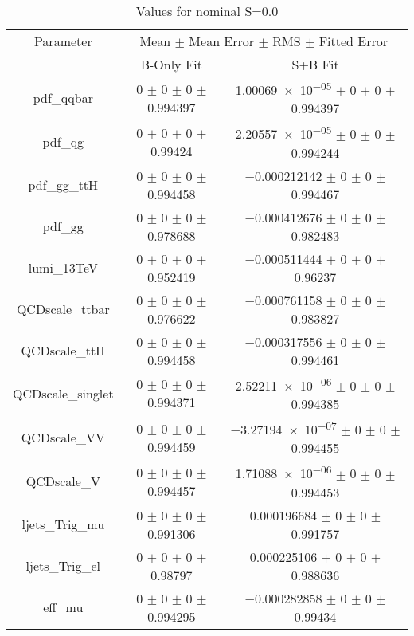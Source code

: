 \begin{table}
\centering
\caption{Values for nominal S=0.0}
\begin{tabular}{ccc}
\toprule
Parameter 	& \multicolumn{2}{c}{Mean $\pm$ Mean Error $\pm$ RMS $\pm$ Fitted Error}\\
 	& B-Only Fit & S+B Fit\\
\midrule
pdf\_qqbar 	& \num{0} $\pm$ \num{0} $\pm$ \num{0} $\pm$ \num{0.994397} 	& \num{1.00069e-05} $\pm$ \num{0} $\pm$ \num{0} $\pm$ \num{0.994397}\\
pdf\_qg 	& \num{0} $\pm$ \num{0} $\pm$ \num{0} $\pm$ \num{0.99424} 	& \num{2.20557e-05} $\pm$ \num{0} $\pm$ \num{0} $\pm$ \num{0.994244}\\
pdf\_gg\_ttH 	& \num{0} $\pm$ \num{0} $\pm$ \num{0} $\pm$ \num{0.994458} 	& \num{-0.000212142} $\pm$ \num{0} $\pm$ \num{0} $\pm$ \num{0.994467}\\
pdf\_gg 	& \num{0} $\pm$ \num{0} $\pm$ \num{0} $\pm$ \num{0.978688} 	& \num{-0.000412676} $\pm$ \num{0} $\pm$ \num{0} $\pm$ \num{0.982483}\\
lumi\_13TeV 	& \num{0} $\pm$ \num{0} $\pm$ \num{0} $\pm$ \num{0.952419} 	& \num{-0.000511444} $\pm$ \num{0} $\pm$ \num{0} $\pm$ \num{0.96237}\\
QCDscale\_ttbar 	& \num{0} $\pm$ \num{0} $\pm$ \num{0} $\pm$ \num{0.976622} 	& \num{-0.000761158} $\pm$ \num{0} $\pm$ \num{0} $\pm$ \num{0.983827}\\
QCDscale\_ttH 	& \num{0} $\pm$ \num{0} $\pm$ \num{0} $\pm$ \num{0.994458} 	& \num{-0.000317556} $\pm$ \num{0} $\pm$ \num{0} $\pm$ \num{0.994461}\\
QCDscale\_singlet 	& \num{0} $\pm$ \num{0} $\pm$ \num{0} $\pm$ \num{0.994371} 	& \num{2.52211e-06} $\pm$ \num{0} $\pm$ \num{0} $\pm$ \num{0.994385}\\
QCDscale\_VV 	& \num{0} $\pm$ \num{0} $\pm$ \num{0} $\pm$ \num{0.994459} 	& \num{-3.27194e-07} $\pm$ \num{0} $\pm$ \num{0} $\pm$ \num{0.994455}\\
QCDscale\_V 	& \num{0} $\pm$ \num{0} $\pm$ \num{0} $\pm$ \num{0.994457} 	& \num{1.71088e-06} $\pm$ \num{0} $\pm$ \num{0} $\pm$ \num{0.994453}\\
ljets\_Trig\_mu 	& \num{0} $\pm$ \num{0} $\pm$ \num{0} $\pm$ \num{0.991306} 	& \num{0.000196684} $\pm$ \num{0} $\pm$ \num{0} $\pm$ \num{0.991757}\\
ljets\_Trig\_el 	& \num{0} $\pm$ \num{0} $\pm$ \num{0} $\pm$ \num{0.98797} 	& \num{0.000225106} $\pm$ \num{0} $\pm$ \num{0} $\pm$ \num{0.988636}\\
eff\_mu 	& \num{0} $\pm$ \num{0} $\pm$ \num{0} $\pm$ \num{0.994295} 	& \num{-0.000282858} $\pm$ \num{0} $\pm$ \num{0} $\pm$ \num{0.99434}\\

\end{tabular}
\end{table}
